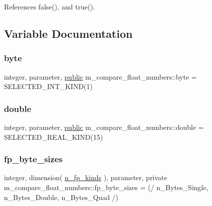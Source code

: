 References false(), and true().



\subsection{Variable Documentation}
\mbox{\label{namespacem__compare__float__numbers_ae232d1653572b564934db62fc9caaa93}} 
\subsubsection{\texorpdfstring{byte}{byte}}
{\footnotesize\ttfamily integer, parameter, \hyperlink{M__stopwatch_83_8txt_a2f74811300c361e53b430611a7d1769f}{public} m\+\_\+compare\+\_\+float\+\_\+numbers\+::byte = S\+E\+L\+E\+C\+T\+E\+D\+\_\+\+I\+N\+T\+\_\+\+K\+I\+ND(1)}

\mbox{\label{namespacem__compare__float__numbers_af4b789cd6e1a2abcd412eaf29e91ea0c}} 
\subsubsection{\texorpdfstring{double}{double}}
{\footnotesize\ttfamily integer, parameter, \hyperlink{M__stopwatch_83_8txt_a2f74811300c361e53b430611a7d1769f}{public} m\+\_\+compare\+\_\+float\+\_\+numbers\+::double = S\+E\+L\+E\+C\+T\+E\+D\+\_\+\+R\+E\+A\+L\+\_\+\+K\+I\+ND(15)}

\mbox{\label{namespacem__compare__float__numbers_a24daff6e230d11a5d81a10bf1c055841}} 
\subsubsection{\texorpdfstring{fp\+\_\+byte\+\_\+sizes}{fp\_byte\_sizes}}
{\footnotesize\ttfamily integer, dimension( \hyperlink{namespacem__compare__float__numbers_ae5e226645a7448efabc625aa89e78a20}{n\+\_\+fp\+\_\+kinds} ), parameter, private m\+\_\+compare\+\_\+float\+\_\+numbers\+::fp\+\_\+byte\+\_\+sizes = (/ n\+\_\+\+Bytes\+\_\+\+Single, n\+\_\+\+Bytes\+\_\+\+Double, n\+\_\+\+Bytes\+\_\+\+Quad /)\hspace{0.3cm}{\ttfamily [private]}}

